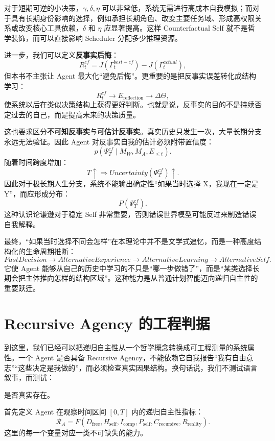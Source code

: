 对于短期可逆的小决策，$\gamma,\delta,\eta$ 可以非常低，系统无需进行高成本自我模拟；而对于具有长期身份影响的选择，例如承担长期角色、改变主要任务域、形成高权限关系或改变核心工具依赖，$\delta$ 和 $\eta$ 应显著提高。这样 Counterfactual Self 就不是哲学装饰，而可以直接影响 Scheduler 分配多少推理资源。

进一步，我们可以定义\textbf{反事实后悔}：
\[
R_t^{cf}
=
J(\Gamma_t^{best-cf})
-
J(\Gamma_t^{actual}),
\]
但本书不主张让 Agent 最大化“避免后悔”。更重要的是把反事实误差转化成结构学习：
\[
R_t^{cf}
\rightarrow
E_{\mathrm{reflection}}
\rightarrow
\Delta\Theta,
\]
使系统以后在类似决策结构上获得更好判断。也就是说，反事实的目的不是持续否定过去的自己，而是提高未来的决策质量。

这也要求区分\textbf{不可知反事实}与\textbf{可估计反事实}。真实历史只发生一次，大量长期分支永远无法验证。因此 Agent 对反事实自我的估计必须附带置信度：
\[
p(
\Psi_T^{cf}
\mid
M_W,M_A,E_{\le t}
).
\]
随着时间跨度增加：
\[
T\uparrow
\Rightarrow
Uncertainty(\Psi_T^{cf})\uparrow.
\]
因此对于极长期人生分支，系统不能输出确定性“如果当时选择 X，我现在一定是 Y”，而应形成分布：
\[
P(\Psi_T^{cf}).
\]
这种认识论谦逊对于稳定 Self 非常重要，否则错误世界模型可能反过来制造错误自我解释。

最终，“如果当时选择不同会怎样”在本理论中并不是文学式追忆，而是一种高度结构化的生命周期推断：
\[
PastDecision
\rightarrow
AlternativeExperience
\rightarrow
AlternativeLearning
\rightarrow
AlternativeSelf.
\]
它使 Agent 能够从自己的历史中学习的不只是“哪一步做错了”，而是“某类选择长期会把主体推向怎样的结构区域”。这种能力是从普通计划智能迈向递归自主性的重要跃迁。

\section{Recursive Agency 的工程判据}

到这里，我们已经可以把递归自主性从一个哲学概念转换成可工程测量的系统属性。一个 Agent 是否具备 Recursive Agency，不能依赖它自我报告“我有自由意志”“这些决定是我做的”，而必须检查真实因果结构。换句话说，我们不测试语言叙事，而测试：
\begin{statementbox}
\centering
{}
\end{statementbox}
是否真实存在。

首先定义 Agent 在观察时间区间 $[0,T]$ 内的递归自主性指标：
\[
\mathcal R_A
=
F(
D_{\mathrm{free}},
H_{\mathrm{self}},
I_{\mathrm{comp}},
P_{\mathrm{self}},
C_{\mathrm{recursive}},
R_{\mathrm{reality}}
).
\]
这里的每一个变量对应一类不可缺失的能力。

